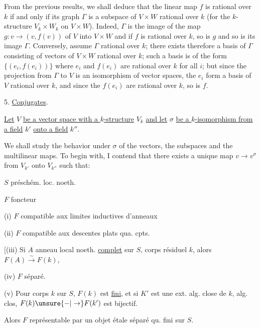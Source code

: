 From the previous results, we shall deduce that the linear map $f$ is rational over $k$ if and only if its graph $\Gamma$ is a subspace of $V\times W$ rational over $k$ (for the $k$-structure $V_k\times W_k$ on $V\times W$). Indeed, $\Gamma$ is the image of the map $g:v\longrightarrow(v,f(v))$ of $V$ into $V\times W$ and if $f$ is rational over $k$, so is $g$ and so is its image $\Gamma$. Conversely, assume $\Gamma$ rational over $k$; there exists therefore a basis of $\Gamma$ consisting of vectors of $V\times W$ rational over $k$; such a basis is of the form $\{(e_i,f(e_i))\}$ where $e_i$ and $f(e_i)$ are rational over $k$ for all $i$; but since the projection from $\Gamma$ to $V$ is an isomorphism of vector spaces, the $e_i$ form a basis of $V$ rational over $k$, and since the $f(e_i)$ are rational over $k$, so is $f$.

5. \uline{Conjugates}.

\uline{Let} $V$ \uline{be a vector space with a $k$-structure} $V_k$ \uline{and let} $\sigma$ \uline{be a $k$-isomorphism from a field} $k'$ \uline{onto a field} $k''$.

We shall study the behavior under $\sigma$ of the vectors, the subspaces and the multilinear maps. To begin with, I contend that there exists a unique map $v\longrightarrow v^\sigma$ from $V_{k'}$ onto $V_{k''}$ such that:

$S$ préschém. loc. noeth.

$F$ foncteur

(i) $F$ compatible aux limites inductives d'anneaux

(ii) $F$ compatible aux descentes  plats qua. cpts. 

[(iii) Si $A$ anneau local noeth. \uline{complet} sur $S$, corps résiduel $k$, alors $F(A)\xrightarrow{\sim}F(k)$,

(iv) $F$ séparé.

(v) Pour  corps $k$ sur $S$, $F(k)$ est \uline{fini}, et si $K'$ est une ext. alg. close de $k$,  alg. clos, $F(k)\unsure{-|\to}F(k')$ est bijectif.

Alors $F$ représentable par un  objet étale  séparé qu. fini sur $S$.


